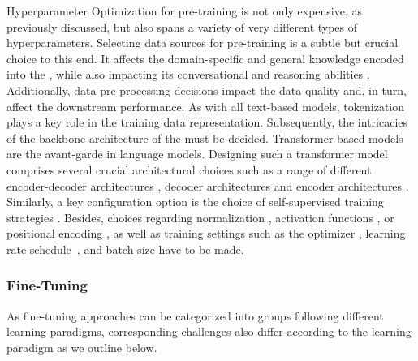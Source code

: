 Hyperparameter Optimization for pre-training is not only expensive, as previously discussed, but also spans a variety of very different types of hyperparameters.  
Selecting data sources for pre-training is a subtle but crucial choice to this end. 
It affects the domain-specific and general knowledge encoded into the \LLM, while also impacting its conversational and reasoning abilities \cite{zhao-arxiv23a}.
Additionally, data pre-processing decisions impact the data quality and, in turn, affect the downstream performance. 
As with all text-based models, tokenization \cite{schuster-ieee2012, sennrich-acl2016a, kudo-acl2018a} plays a key role in the training data representation.
Subsequently, the intricacies of the backbone architecture of the \LLM must be decided. 
Transformer-based models \cite{vaswani-neurips17a} are the avant-garde in language models.
Designing such a transformer model comprises several crucial architectural choices such as a range of different encoder-decoder architectures \cite{vaswani-neurips17a, lewis-acl20a}, decoder architectures \cite{brown-neurips20a, zhang-arxiv2022a} and encoder architectures \cite{devlin-acl19a,liu-arxiv19a}.
Similarly, a key configuration option is the choice of self-supervised training strategies \cite{lewis-acl20a}. Besides, choices regarding normalization \cite{ba-arxiv2016a, xiong-icml20a}, activation functions \cite{hendrycks-arxiv2016a, shazeer-arxiv2020a}, or positional encoding \cite{su-arxiv2022}, as well as training settings such as the optimizer \cite{kingma-iclr15a, loshchilov-iclr18a, shazeer-icml18a}, learning rate schedule~\cite{loshchilov-iclr17a}, and batch size have to be made. 

\subsubsection{Fine-Tuning}
As fine-tuning approaches can be categorized into groups following different learning paradigms, corresponding challenges also differ according to the learning paradigm as we outline below.



